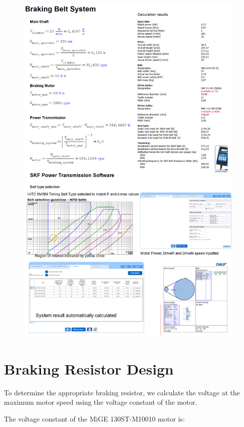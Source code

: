 \begin{figure}[H]
    \centering
    \includegraphics[width=1\linewidth]{chaps-append/calcs/belt_selection.png}
\end{figure}

\section{Braking Resistor Design}
\label{calcs:braking_resistor}

To determine the appropriate braking resistor, we calculate the voltage at the maximum motor speed using the voltage constant of the motor.

The voltage constant of the MiGE 130ST-M10010 motor is:

